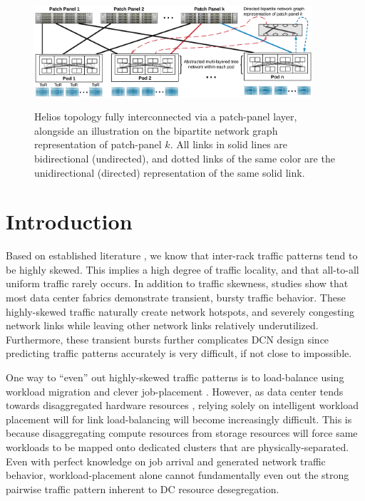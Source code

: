\documentclass[sigconf]{acmart}
\theoremstyle{definition}
\begin{document}
\newcommand{\floor}[1]{\left\lfloor #1 \right\rfloor}
\newcommand{\ceil}[1]{\left\lceil #1 \right\rceil}

\begin{figure}[ht!]
\centering
\includegraphics[height= 1.6in,trim={0.7cm 0.6cm 0.7cm 0.7cm}, width=0.92\textwidth]{figures/helios_v2}
\caption{Helios topology fully interconnected via a patch-panel layer, alongside an illustration on the bipartite network graph representation of patch-panel $k$. All links in solid lines are bidirectional (undirected), and dotted links of the same color are the unidirectional (directed) representation of the same solid link.}
\label{direct_connect_topology}
\end{figure}

\section{Introduction}

Based on established literature \cite{benson2010network, benson2009understanding}, we know that inter-rack traffic patterns tend to be highly skewed. This implies a high degree of traffic locality, and that all-to-all uniform traffic rarely occurs. In addition to traffic skewness, studies \cite{delimitrou2012echo} show that most data center fabrics demonstrate transient, bursty traffic behavior. These highly-skewed traffic naturally create network hotspots, and severely congesting network links while leaving other network links relatively underutilized. Furthermore, these transient bursts further complicates DCN design since predicting traffic patterns accurately is very difficult, if not close to impossible.

One way to ``even'' out highly-skewed traffic patterns is to load-balance using workload migration and clever job-placement \cite{jain2012topology}. However, as data center tends towards disaggregated hardware resources \cite{papaioannou2016benefits}, relying solely on intelligent workload placement will for link load-balancing will become increasingly difficult. This is because disaggregating compute resources from storage resources will force same workloads to be mapped onto dedicated clusters that are physically-separated. Even with perfect knowledge on job arrival and generated network traffic behavior, workload-placement alone cannot fundamentally even out the strong pairwise traffic pattern inherent to DC resource desegregation. 
\end{document}
